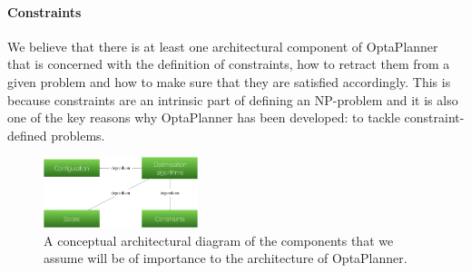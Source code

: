 \paragraph{Constraints} We believe that there is at least one architectural component of OptaPlanner that is concerned with the definition of constraints, how to retract them from a given problem and how to make sure that they are satisfied accordingly. This is because constraints are an intrinsic part of defining an NP-problem and it is also one of the key reasons why OptaPlanner has been developed: to tackle constraint-defined problems.
\begin{figure}[H]
    \centering
    \includegraphics[width=0.4\textwidth]{figures/step2/hypoth.png}
    \caption{A conceptual architectural diagram of the components that we assume will be of importance to the architecture of OptaPlanner.}
    \label{fig:concept-hypoth}
\end{figure}
